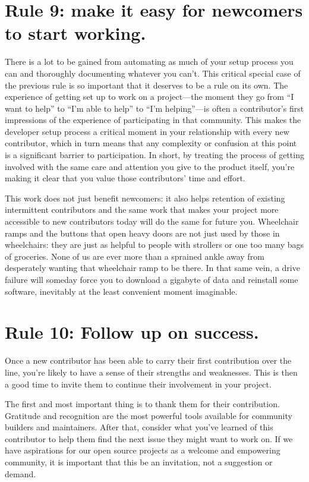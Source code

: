 \documentclass[10pt,letterpaper]{article}
\newcommand{\rulemajor}[1]{\section*{#1}}
\begin{document}
\rulemajor{Rule 9: make it easy for newcomers to start working.}

There is a lot to be gained from automating as much of your setup process you can
and thoroughly documenting whatever you can't. 
This critical special case of the previous rule is so important that it deserves to be a rule on its own.
The experience of getting set up to work on a project---the moment they go from ``I want to help''
to ``I'm able to help'' to ``I'm helping''---is often a contributor's first impressions of 
the experience of participating in that community.
This makes the developer setup process a critical moment in your relationship with every new contributor,
which in turn means that any complexity or confusion at this point is a significant barrier to participation.
In short, by treating the process of getting involved with the same care and attention you give
to the product itself, you're making it clear that you value those contributors' time and effort.

This work does not just benefit newcomers:
it also helps retention of existing intermittent contributors and the same work that makes your project more
accessible to new contributors today will do the same for future you.
Wheelchair ramps and the buttons that open heavy doors are not just used by those in wheelchairs:
they are just as helpful to people with strollers or one too many bags of groceries.
None of us are ever more than a sprained ankle away from desperately wanting that wheelchair ramp to be there.
In that same vein, a drive failure will someday force you to download a gigabyte of data
and reinstall some software, inevitably at the least convenient moment imaginable. 

\rulemajor{Rule 10: Follow up on success.}

Once a new contributor has been able to carry their first contribution over the line, 
you're likely to have a sense of their strengths and weaknesses.
This is then a good time to invite them to continue their involvement in your project.

The first and most important thing is to thank them for their contribution.
Gratitude and recognition are the most powerful tools available for community builders and maintainers. 
After that,
consider what you've learned of this contributor to help them find
the next issue they might want to work on.
If we have aspirations for our open source projects as a welcome and empowering community,
it is important that this be an invitation,
not a suggestion or demand. 


\end{document}
